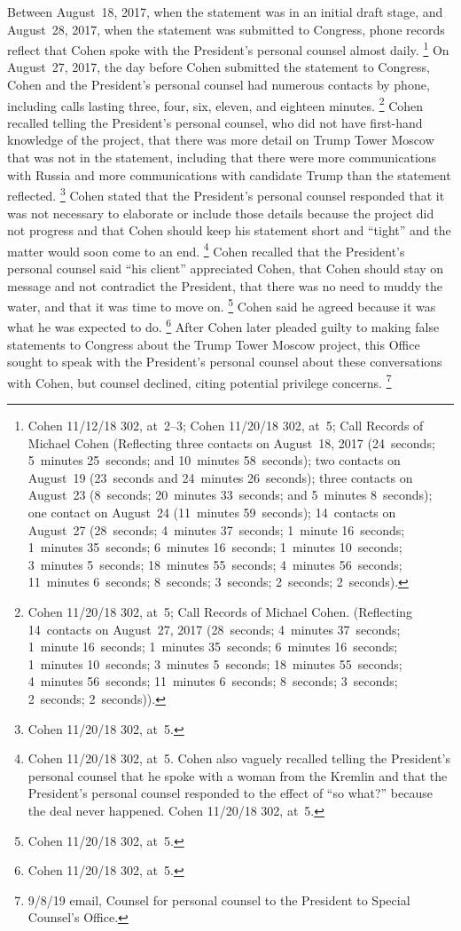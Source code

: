 Between August~18, 2017, when the statement was in an initial draft stage, and August~28, 2017, when the statement was submitted to Congress, phone records reflect that Cohen spoke with the President's personal counsel almost daily.%
\footnote{Cohen 11/12/18 302, at~2--3;
Cohen 11/20/18 302, at~5;
Call Records of Michael Cohen (Reflecting three contacts on August~18, 2017 (24~seconds;
5~minutes 25~seconds;
and 10~minutes 58~seconds);
two contacts on August~19 (23~seconds and 24~minutes 26~seconds);
three contacts on August~23 (8~seconds; 20~minutes 33~seconds;
and 5~minutes 8~seconds);
one contact on August~24 (11~minutes 59~seconds);
14~contacts on August~27 (28~seconds;
4~minutes 37~seconds;
1~minute 16~seconds;
1~minutes 35~seconds;
6~minutes 16~seconds;
1~minutes 10~seconds;
3~minutes 5~seconds;
18~minutes 55~seconds;
4~minutes 56~seconds;
11~minutes 6~seconds;
8~seconds;
3~seconds;
2~seconds;
2~seconds).}
On August~27, 2017, the day before Cohen submitted the statement to Congress, Cohen and the President's personal counsel had numerous contacts by phone, including calls lasting three, four, six, eleven, and eighteen minutes.%
\footnote{Cohen 11/20/18 302, at~5;
Call Records of Michael Cohen.
(Reflecting 14~contacts on August~27, 2017 (28~seconds;
4~minutes 37~seconds;
1~minute 16~seconds;
1~minutes 35~seconds;
6~minutes 16~seconds;
1~minutes 10~seconds;
3~minutes 5~seconds;
18~minutes 55~seconds;
4~minutes 56~seconds;
11~minutes 6~seconds;
8~seconds;
3~seconds;
2~seconds;
2~seconds)).
}
Cohen recalled telling the President's personal counsel, who did not have first-hand knowledge of the project, that there was more detail on Trump Tower Moscow that was not in the statement, including that there were more communications with Russia and more communications with candidate Trump than the statement reflected.%
\footnote{Cohen 11/20/18 302, at~5.}
Cohen stated that the President's personal counsel responded that it was not necessary to elaborate or include those details because the project did not progress and that Cohen should keep his statement short and ``tight'' and the matter would soon come to an end.%
\footnote{Cohen 11/20/18 302, at~5.
Cohen also vaguely recalled telling the President's personal counsel that he spoke with a woman from the Kremlin and that the President's personal counsel responded to the effect of ``so what?'' because the deal never happened.
Cohen 11/20/18 302, at~5.}
Cohen recalled that the President's personal counsel said ``his client'' appreciated Cohen, that Cohen should stay on message and not contradict the President, that there was no need to muddy the water, and that it was time to move on.%
\footnote{Cohen 11/20/18 302, at~5.}
Cohen said he agreed because it was what he was expected to do.%
\footnote{Cohen 11/20/18 302, at~5.}
After Cohen later pleaded guilty to making false statements to Congress about the Trump Tower Moscow project, this Office sought to speak with the President's personal counsel about these conversations with Cohen, but counsel declined, citing potential privilege concerns.%
\footnote{9/8/19 email, Counsel for personal counsel to the President to Special Counsel's Office.}

